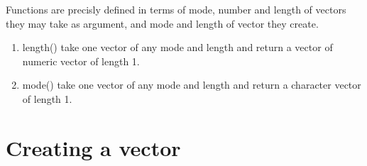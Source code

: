 \documentclass[pdflatex]{article}
\begin{document}
Functions are precisly defined in terms of mode, number and length of vectors they may take as argument, and mode and length of vector they create.

\begin{enumerate}
\item length() take one vector of any mode and length and return a vector of numeric vector of length 1.
\item mode() take one vector of any mode and length and return a character vector of length 1.
\end{enumerate}

\section{Creating a vector}
\end{document}
